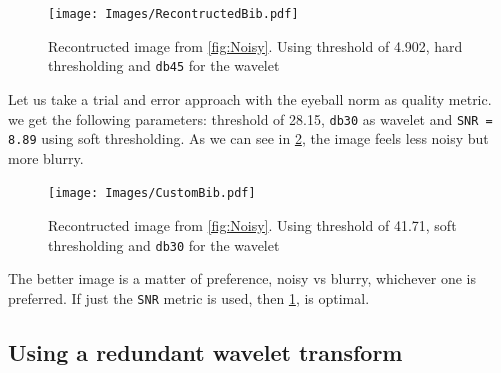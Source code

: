 \documentclass[a4paper]{article}
\begin{document}
    \begin{figure}[H]
	\centering
	\texttt{[image: Images/RecontructedBib.pdf]}
	\caption{Recontructed image from \cref{fig:Noisy}. Using threshold of 4.902, hard thresholding and \texttt{db45} for the wavelet}
	\label{fig:RecBib}
\end{figure}
	
	Let us take a trial and error approach with the eyeball norm as quality metric. we get the following parameters: threshold of 28.15, \texttt{db30} as wavelet and \texttt{SNR = 8.89} using soft thresholding. As we can see in \cref{fig:CusBib}, the image feels less noisy but more blurry.
	
    \begin{figure}[H]
	\centering
	\texttt{[image: Images/CustomBib.pdf]}
	\caption{Recontructed image from \cref{fig:Noisy}. Using threshold of 41.71, soft thresholding and \texttt{db30} for the wavelet}
	\label{fig:CusBib}
\end{figure}
	
	The better image is a matter of preference, noisy vs blurry, whichever one is preferred. If just the \texttt{SNR} metric is used, then \cref{fig:RecBib}, is optimal.
	

	
	
    \subsection{Using a redundant wavelet transform}
\end{document}
